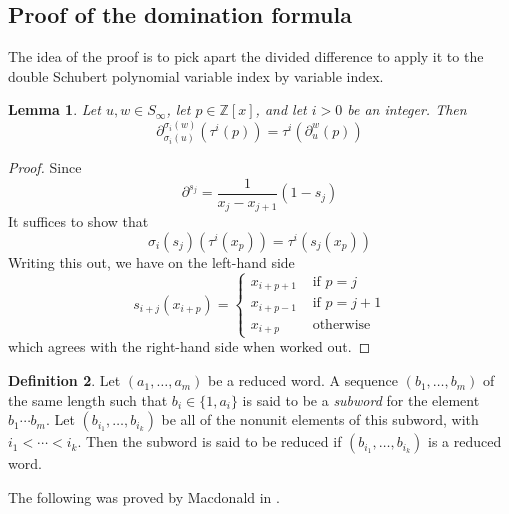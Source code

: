 \documentclass[reqno]{amsart}
\newtheorem{lemma}{Lemma}[subsection]
\theoremstyle{definition}
\newtheorem{definition}[lemma]{Definition}
\theoremstyle{remark}
\numberwithin{equation}{subsection}
\newcommand{\shifthom}{\tau}
\newcommand{\shiftvby}[1]{\shifthom^{#1}}
\begin{document}
\subsection{Proof of the domination formula}

The idea of the proof is to pick apart the divided difference to apply it to the double Schubert polynomial variable index by variable index.

\begin{lemma} \label{lemma:varshift}
Let $u,w\in S_\infty$, let $p\in\mathbb{Z}[x]$, and let $i>0$ be an integer. Then
$$\partial_{\sigma_i(u)}^{\sigma_i(w)}(\shiftvby{i}(p))=\shiftvby{i}(\partial_u^w(p))$$
\end{lemma}
\begin{proof}
Since
$$\partial^{s_j}=\frac{1}{x_j-x_{j+1}}(1-s_j)$$
It suffices to show that
$$\sigma_i(s_j)(\shiftvby{i}(x_p))=\shiftvby{i}(s_j(x_p))$$
Writing this out, we have on the left-hand side
$$s_{i+j}(x_{i+p})=\begin{cases}
x_{i+p+1}&\mbox{ if }p=j\\
x_{i+p-1}&\mbox{ if }p=j+1\\
x_{i+p}&\mbox{ otherwise}
\end{cases}$$
which agrees with the right-hand side when worked out.
\end{proof}

\begin{definition}
Let $(a_1,\ldots,a_m)$ be a reduced word. A sequence $(b_1,\ldots,b_m)$ of the same length such that $b_i\in \{1,a_i\}$ is said to be a \emph{subword} for the element $b_1\cdots b_m$. Let $(b_{i_1},\ldots,b_{i_k})$ be all of the nonunit elements of this subword, with $i_1<\cdots<i_k$. Then the subword is said to be reduced if $(b_{i_1},\ldots,b_{i_k})$ is a reduced word.
\end{definition}



The following was proved by Macdonald in \cite{notes}.
\end{document}
